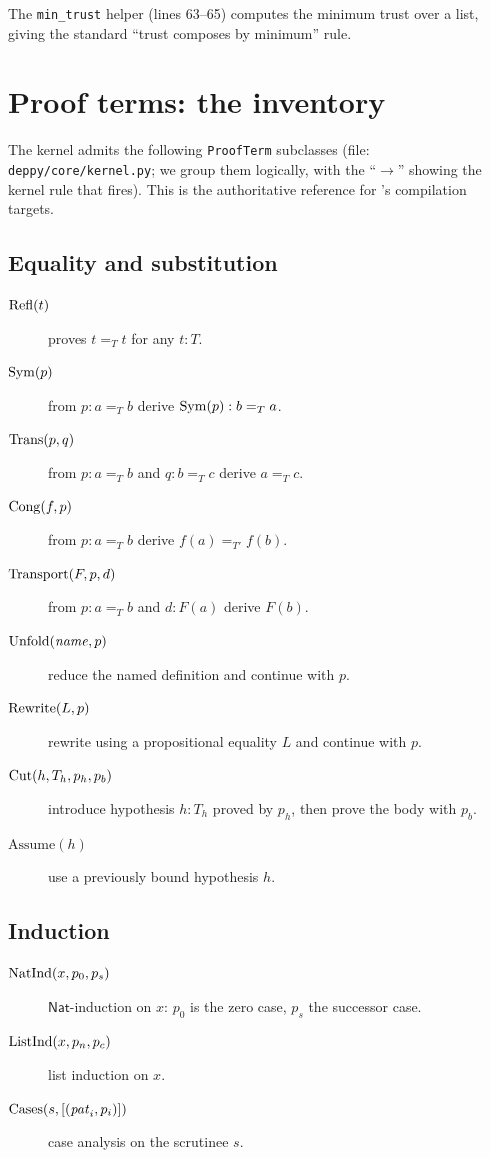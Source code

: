 The \texttt{min\_trust} helper (lines 63--65) computes the minimum
trust over a list, giving the standard ``trust composes by minimum''
rule.

\section{Proof terms: the inventory}
\label{sec:proofterm-inventory}

The kernel admits the following \texttt{ProofTerm} subclasses (file:
\texttt{deppy/core/kernel.py}; we group them logically, with the
``$\to$'' showing the kernel rule that fires).  This is the
authoritative reference for \PSDL's compilation targets.

\subsection{Equality and substitution}

\begin{description}
  \item[$\mathrm{Refl}(t)$] proves $t =_T t$ for any $t : T$.
  \item[$\mathrm{Sym}(p)$] from $p : a =_T b$ derive $\mathrm{Sym}(p) : b =_T a$.
  \item[$\mathrm{Trans}(p, q)$] from $p : a =_T b$ and $q : b =_T c$ derive
    $a =_T c$.
  \item[$\mathrm{Cong}(f, p)$] from $p : a =_T b$ derive $f(a) =_{T'} f(b)$.
  \item[$\mathrm{Transport}(F, p, d)$] from $p : a =_T b$ and $d : F(a)$
    derive $F(b)$.
  \item[$\mathrm{Unfold}(\mathit{name}, p)$] reduce the named definition and
    continue with $p$.
  \item[$\mathrm{Rewrite}(L, p)$] rewrite using a propositional equality $L$
    and continue with $p$.
  \item[$\mathrm{Cut}(h, T_h, p_h, p_b)$] introduce hypothesis $h : T_h$
    proved by $p_h$, then prove the body with $p_b$.
  \item[$\mathrm{Assume}(h)$] use a previously bound hypothesis $h$.
\end{description}

\subsection{Induction}

\begin{description}
  \item[$\mathrm{NatInd}(x, p_0, p_s)$] $\mathsf{Nat}$-induction on $x$:
    $p_0$ is the zero case, $p_s$ the successor case.
  \item[$\mathrm{ListInd}(x, p_n, p_c)$] list induction on $x$.
  \item[{$\mathrm{Cases}(s, [(\mathit{pat}_i, p_i)])$}] case analysis on the
    scrutinee $s$.
\end{description}

